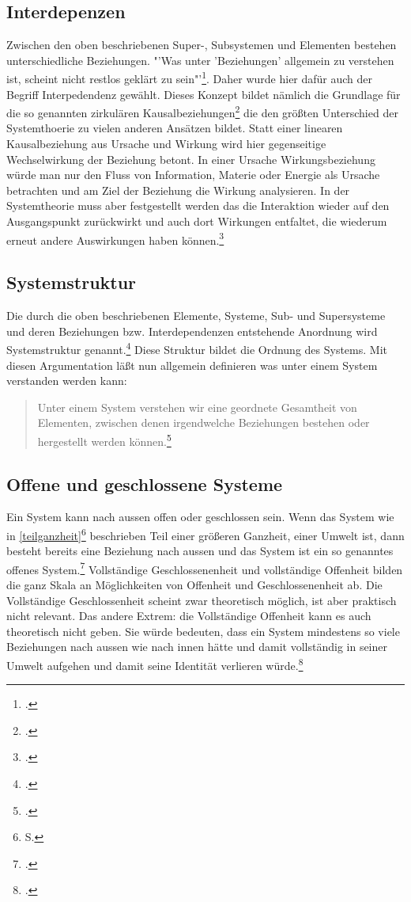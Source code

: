 \documentclass[a4paper,12pt]{article}
\begin{document}
\subsection{Interdepenzen}\label{interdep}
Zwischen den oben beschriebenen Super-, Subsystemen und Elementen bestehen unterschiedliche Beziehungen. "'Was unter 'Beziehungen' allgemein zu verstehen ist, scheint nicht restlos geklärt zu sein"'\footcite[109]{Ulrich1968}. Daher wurde hier dafür auch der Begriff Interpedendenz gewählt. Dieses Konzept bildet nämlich die Grundlage für die so genannten zirkulären Kausalbeziehungen\footcite[S. 104]{Helfrich2024} die den größten Unterschied der Systemthoerie zu vielen anderen Ansätzen bildet. Statt einer linearen Kausalbeziehung aus Ursache und Wirkung wird hier gegenseitige Wechselwirkung der Beziehung betont. In einer Ursache Wirkungsbeziehung würde man nur den Fluss von Information, Materie oder Energie als Ursache betrachten und am Ziel der Beziehung die Wirkung analysieren. In der Systemtheorie muss aber festgestellt werden das die Interaktion wieder auf den Ausgangspunkt zurückwirkt und auch dort Wirkungen entfaltet, die wiederum erneut andere Auswirkungen haben können.\footcite[S. 104]{Helfrich2024} 
\subsection{Systemstruktur}\label{systemstruktur}
Die durch die oben beschriebenen Elemente, Systeme, Sub- und Supersysteme und deren Beziehungen bzw. Interdependenzen entstehende Anordnung wird Systemstruktur genannt.\footcite[S. 110]{Ulrich1968} Diese Struktur bildet die Ordnung des Systems. Mit diesen Argumentation läßt nun allgemein definieren was unter einem System verstanden werden kann:
\begin{quote}
    Unter einem System verstehen wir eine geordnete Gesamtheit von Elementen, zwischen denen irgendwelche Beziehungen bestehen oder hergestellt werden können.\footcite[S. 105]{Ulrich1968}
\end{quote}
\subsection{Offene und geschlossene Systeme}\label{offengeschlossen}
Ein System kann nach aussen offen oder geschlossen sein. Wenn das System wie in \ref{teilganzheit}\footnote{S. \pageref{teilganzheit}} beschrieben Teil einer größeren Ganzheit, einer Umwelt ist, dann besteht bereits eine Beziehung nach aussen und das System ist ein so genanntes offenes System.\footcite[S. 112]{Ulrich1968} Vollständige Geschlossenenheit und vollständige Offenheit bilden die ganz Skala an Möglichkeiten von Offenheit und Geschlossenenheit ab. Die Vollständige Geschlossenheit scheint zwar theoretisch möglich, ist aber praktisch nicht relevant. Das andere Extrem: die Vollständige Offenheit kann es auch theoretisch nicht geben. Sie würde bedeuten, dass ein System mindestens so viele Beziehungen nach aussen wie nach innen hätte und damit vollständig in seiner Umwelt aufgehen und damit seine Identität verlieren würde.\footcite[S.112 - 113]{Ulrich1968} 
\end{document}
